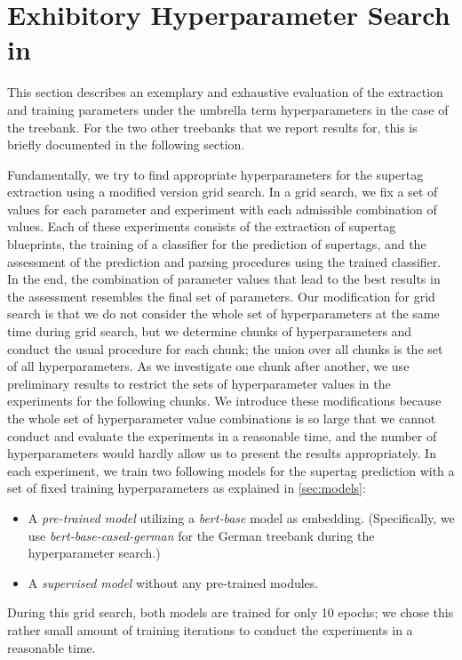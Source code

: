 \documentclass[../../document.tex]{subfiles}
\begin{document}
    \section{Exhibitory Hyperparameter Search in }\label{sec:gridsearch}
    This section describes an exemplary and exhaustive evaluation of the extraction and training parameters under the umbrella term hyperparameters in the case of the \negra{} treebank.
    For the two other treebanks that we report results for, this is briefly documented in the following section.

    Fundamentally, we try to find appropriate hyperparameters for the supertag extraction using a modified version grid search.
    In a grid search, we fix a set of values for each parameter and experiment with each admissible combination of values.
    Each of these experiments consists of the extraction of supertag blueprints, the training of a classifier for the prediction of supertags, and the assessment of the prediction and parsing procedures using the trained classifier.
    In the end, the combination of parameter values that lead to the best results in the assessment resembles the final set of parameters.
    Our modification for grid search is that we do not consider the whole set of hyperparameters at the same time during grid search, but we determine chunks of hyperparameters and conduct the usual procedure for each chunk; the union over all chunks is the set of all hyperparameters.
    As we investigate one chunk after another, we use preliminary results to restrict the sets of hyperparameter values in the experiments for the following chunks.
    We introduce these modifications because the whole set of hyperparameter value combinations is so large that we cannot conduct and evaluate the experiments in a reasonable time, and the number of hyperparameters would hardly allow us to present the results appropriately.
    In each experiment, we train two following models for the supertag prediction with a set of fixed training hyperparameters as explained in \cref{sec:models}:
    \begin{itemize}
        \item A \emph{pre-trained model} utilizing a \emph{bert-base} model as embedding. (Specifically, we use \emph{bert-base-cased-german} for the German \negra{} treebank during the hyperparameter search.)
        \item A \emph{supervised model} without any pre-trained modules.
    \end{itemize}
    During this grid search, both models are trained for only 10 epochs; we chose this rather small amount of training iterations to conduct the experiments in a reasonable time.
\end{document}
